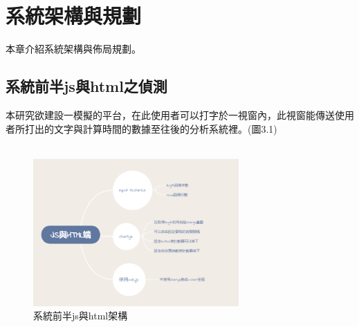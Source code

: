 \chapter{系統架構與規劃}

\lstset{style=mystyle}
本章介紹系統架構與佈局規劃。

\section{系統前半js與html之偵測} 
本研究欲建設一模擬的平台，在此使用者可以打字於一視窗內，此視窗能傳送使用者所打出的文字與計算時間的數據至往後的分析系統裡。(圖3.1)\\\\
\begin{figure}[H] %
		\centering %
		\includegraphics[width=0.7\textwidth]{1.png} %
		\caption{系統前半js與html架構} %
		\label{Fig.3.1} %
\end{figure}
